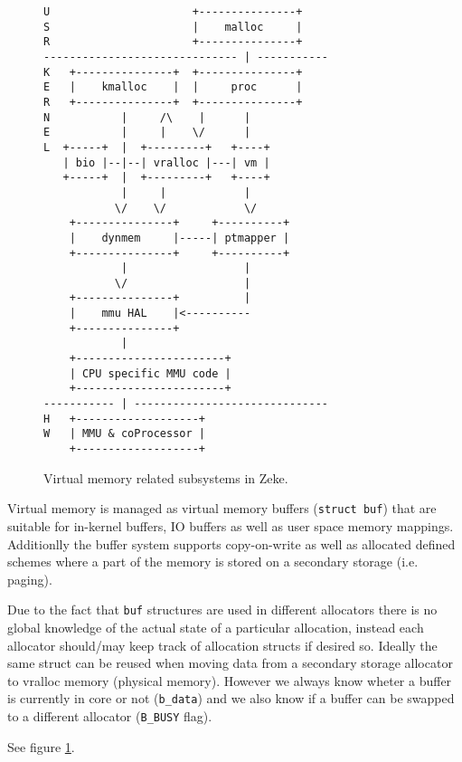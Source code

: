 \begin{figure}
\begin{verbatim}
U                      +---------------+
S                      |    malloc     |
R                      +---------------+
------------------------------ | -----------
K   +---------------+  +---------------+
E   |    kmalloc    |  |     proc      |
R   +---------------+  +---------------+
N           |     /\    |      |
E           |     |    \/      |
L  +-----+  |  +---------+   +----+
   | bio |--|--| vralloc |---| vm |
   +-----+  |  +---------+   +----+
            |     |            |
           \/    \/            \/
    +---------------+     +----------+
    |    dynmem     |-----| ptmapper |
    +---------------+     +----------+
            |                  |
           \/                  |
    +---------------+          |
    |    mmu HAL    |<----------
    +---------------+
            |
    +-----------------------+
    | CPU specific MMU code |
    +-----------------------+
----------- | ------------------------------
H   +-------------------+
W   | MMU & coProcessor |
    +-------------------+
\end{verbatim}
\caption{Virtual memory related subsystems in Zeke.}
\label{figure:vmsubsys}
\end{figure}

Virtual memory is managed as virtual memory buffers (\verb+struct buf+) that
are suitable for in-kernel buffers, IO buffers as well as user space memory
mappings. Additionlly the buffer system supports copy-on-write as well as
allocated defined schemes where a part of the memory is stored on a secondary
storage (i.e. paging).

Due to the fact that \verb+buf+ structures are used in different
allocators there is no global knowledge of the actual state of a particular
allocation, instead each allocator should/may keep track of allocation structs
if desired so. Ideally the same struct can be reused when moving data from a
secondary storage allocator to vralloc memory (physical memory). However we
always know wheter a buffer is currently in core or not (\verb+b_data+) and
we also know if a buffer can be swapped to a different allocator
(\verb+B_BUSY+ flag).

See figure \ref{figure:vmsubsys}.

